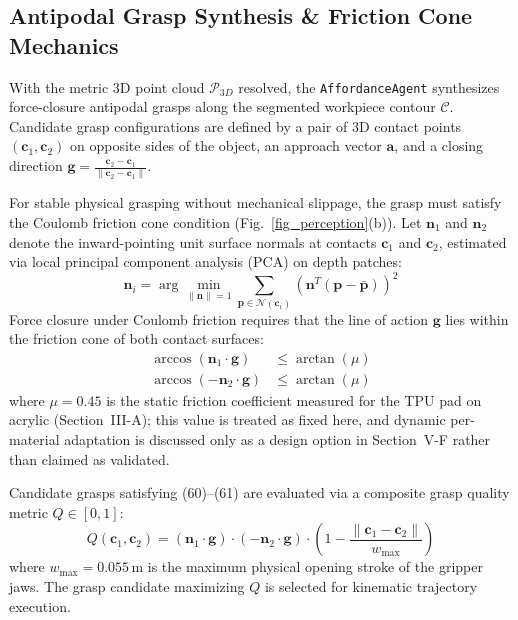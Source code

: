 \documentclass[journal]{IEEEtran}
\begin{document}
\subsection{Antipodal Grasp Synthesis \& Friction Cone Mechanics}
With the metric 3D point cloud $\mathcal{P}_{3D}$ resolved, the \texttt{AffordanceAgent} synthesizes force-closure antipodal grasps along the segmented workpiece contour $\mathcal{C}$. Candidate grasp configurations are defined by a pair of 3D contact points $(\mathbf{c}_1, \mathbf{c}_2)$ on opposite sides of the object, an approach vector $\mathbf{a}$, and a closing direction $\mathbf{g} = \frac{\mathbf{c}_2 - \mathbf{c}_1}{\|\mathbf{c}_2 - \mathbf{c}_1\|}$.

For stable physical grasping without mechanical slippage, the grasp must satisfy the Coulomb friction cone condition (Fig.~\ref{fig_perception}(b)). Let $\mathbf{n}_1$ and $\mathbf{n}_2$ denote the inward-pointing unit surface normals at contacts $\mathbf{c}_1$ and $\mathbf{c}_2$, estimated via local principal component analysis (PCA) on depth patches:
\begin{equation}
\mathbf{n}_i = \arg\min_{\|\mathbf{n}\|=1} \sum_{\mathbf{p} \in \mathcal{N}(\mathbf{c}_i)} \left( \mathbf{n}^T (\mathbf{p} - \bar{\mathbf{p}}) \right)^2
\end{equation}
Force closure under Coulomb friction requires that the line of action $\mathbf{g}$ lies within the friction cone of both contact surfaces:
\begin{align}
\arccos\left( \mathbf{n}_1 \cdot \mathbf{g} \right) &\le \arctan(\mu) \\
\arccos\left( -\mathbf{n}_2 \cdot \mathbf{g} \right) &\le \arctan(\mu)
\end{align}
where $\mu = 0.45$ is the static friction coefficient measured for the TPU pad on acrylic (Section~III-A); this value is treated as fixed here, and dynamic per-material adaptation is discussed only as a design option in Section~V-F rather than claimed as validated.

Candidate grasps satisfying (60)–(61) are evaluated via a composite grasp quality metric $Q \in [0, 1]$:
\begin{equation}
Q(\mathbf{c}_1, \mathbf{c}_2) = \left( \mathbf{n}_1 \cdot \mathbf{g} \right) \cdot \left( -\mathbf{n}_2 \cdot \mathbf{g} \right) \cdot \left( 1 - \frac{\|\mathbf{c}_1 - \mathbf{c}_2\|}{w_{\text{max}}} \right)
\end{equation}
where $w_{\text{max}} = 0.055$\,m is the maximum physical opening stroke of the gripper jaws. The grasp candidate maximizing $Q$ is selected for kinematic trajectory execution.
\end{document}

